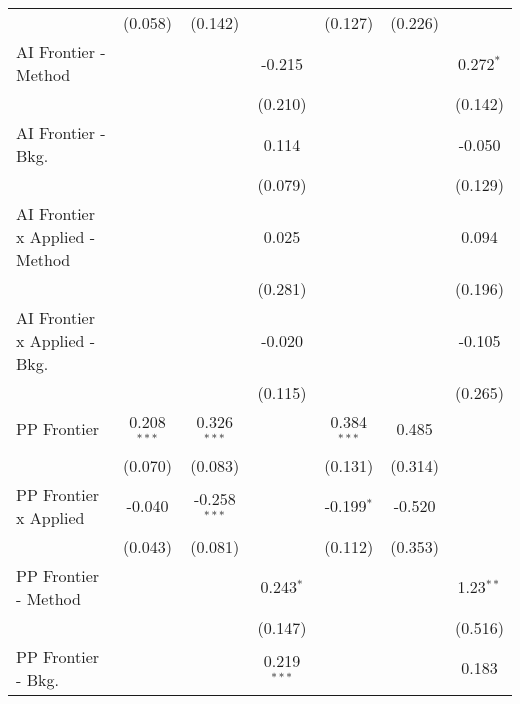 \begin{tabular}{lcccccc}
                                  & (0.058)        & (0.142)        &               & (0.127)       & (0.226) &   \\   
   AI Frontier - Method           &                &                & -0.215        &               &         & 0.272$^{*}$\\   
                                  &                &                & (0.210)       &               &         & (0.142)\\   
   AI Frontier - Bkg.             &                &                & 0.114         &               &         & -0.050\\   
                                  &                &                & (0.079)       &               &         & (0.129)\\   
   AI Frontier x Applied - Method &                &                & 0.025         &               &         & 0.094\\   
                                  &                &                & (0.281)       &               &         & (0.196)\\   
   AI Frontier x Applied - Bkg.   &                &                & -0.020        &               &         & -0.105\\   
                                  &                &                & (0.115)       &               &         & (0.265)\\   
   PP Frontier                    & 0.208$^{***}$  & 0.326$^{***}$  &               & 0.384$^{***}$ & 0.485   &   \\   
                                  & (0.070)        & (0.083)        &               & (0.131)       & (0.314) &   \\   
   PP Frontier x Applied          & -0.040         & -0.258$^{***}$ &               & -0.199$^{*}$  & -0.520  &   \\   
                                  & (0.043)        & (0.081)        &               & (0.112)       & (0.353) &   \\   
   PP Frontier - Method           &                &                & 0.243$^{*}$   &               &         & 1.23$^{**}$\\   
                                  &                &                & (0.147)       &               &         & (0.516)\\   
   PP Frontier - Bkg.             &                &                & 0.219$^{***}$ &               &         & 0.183\\   

\end{tabular}
